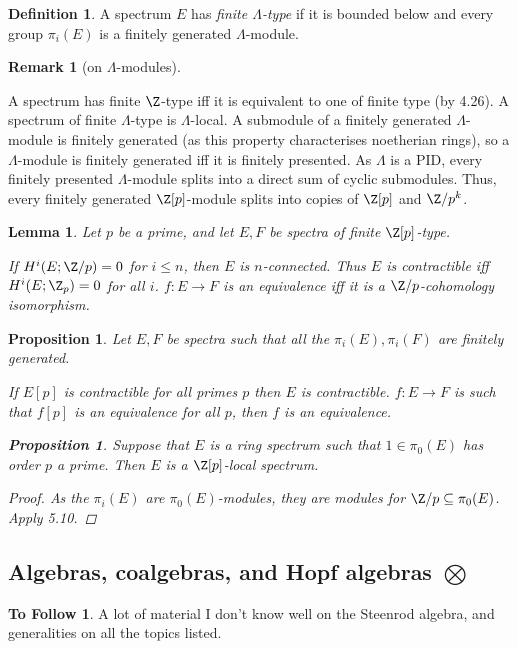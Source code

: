\documentclass[11pt]{article}
\renewcommand{\comment}{}
\theoremstyle{plain}
\newtheorem{lem}[thm]{Lemma}
\newtheorem{prop}[thm]{Proposition}
\theoremstyle{definition}
\newtheorem{defn}[thm]{Definition}
\newtheorem{rmk}[thm]{Remark}
\newtheorem*{ToFollow}{To Follow}
\begin{document}
{\begin{defn}
A spectrum $E$ has \emph{finite $\Lambda$-type} if it is bounded below and every
group $\pi_i(E)$ is a finitely generated $\Lambda$-module.
\end{defn}
\begin{rmk}[on $\Lambda$-modules]\hfil
\begin{itemise}
\itm A spectrum has finite $\Z$-type iff it is equivalent to one of finite type
(by 4.26). A spectrum of finite $\Lambda$-type is $\Lambda$-local.
\itm A submodule of a finitely generated $\Lambda$-module is finitely generated
(as this property characterises noetherian rings), so a $\Lambda$-module is
finitely generated iff it is finitely presented. As $\Lambda$ is a PID, every
finitely presented $\Lambda$-module splits into a direct sum of cyclic
submodules. Thus, every finitely generated $\Z[p]$-module splits into copies of
$\Z[p]$ and $\Z/p^k$.
\end{itemise}
\end{rmk}
\begin{lem}Let $p$ be a prime, and let $E,F$ be spectra of finite $\Z[p]$-type.
\begin{itemise}
\itm[(i)] If $H^i(E;\Z/p)=0$ for $i\leq n$, then $E$ is $n$-connected. Thus $E$
is contractible iff $H^i(E;\Z_p)=0$ for all $i$.
\itm[(ii)] $f:E\to F$ is an equivalence iff it is a $\Z/p$-cohomology
isomorphism.
\end{itemise}
\end{lem}
\begin{prop}Let $E,F$ be spectra such that all the $\pi_i(E),\pi_i(F)$ are
finitely generated.
\begin{itemise}
\itm[(i)] If $E[p]$ is contractible for all primes $p$ then $E$ is contractible.
\itm[(ii)] $f:E\to F$ is such that $f[p]$ is an equivalence for all $p$, then
$f$ is an equivalence.
\end{itemise}
\begin{prop}
Suppose that $E$ is a ring spectrum such that $1\in\pi_0(E)$ has order $p$ a
prime. Then $E$ is a $\Z[p]$-local spectrum.
\end{prop}
\begin{proof}
As the $\pi_i(E)$ are $\pi_0(E)$-modules, they are modules for
$\Z/p\subseteq\pi_0(E)$. Apply 5.10.
\end{proof}
\end{prop}
}   %
\subsection{Algebras, coalgebras, and Hopf algebras
\texorpdfstring{$\bigotimes$}{}}
\comment{
\begin{ToFollow}
A lot of material I don't know well on the Steenrod algebra, and generalities on
all the topics listed.
\end{ToFollow}
}   %
\end{document}
